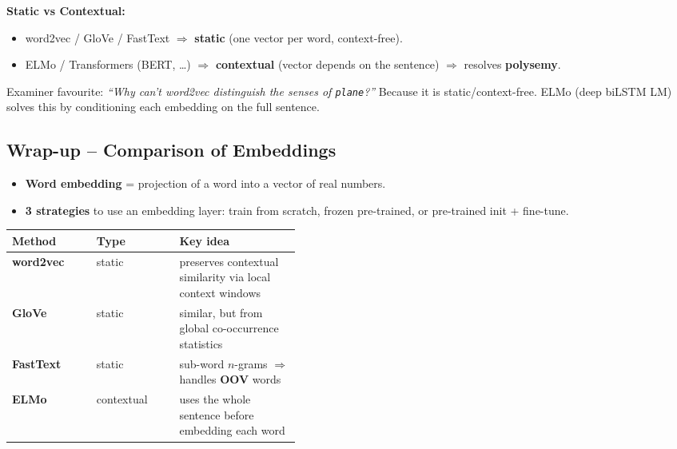 \documentclass[10pt,a4paper]{article}
\begin{document}
	\begin{importantbox}
		\textbf{Static vs Contextual:}
		\begin{itemize}[leftmargin=1.2em, nosep]
			\item word2vec / GloVe / FastText $\Rightarrow$ \textbf{static} (one vector per word, context-free).
			\item ELMo / Transformers (BERT, \dots) $\Rightarrow$ \textbf{contextual} (vector depends on the sentence) $\Rightarrow$ resolves \textbf{polysemy}.
		\end{itemize}
	\end{importantbox}

	\begin{examtipbox}
		Examiner favourite: \emph{``Why can't word2vec distinguish the senses of \textnormal{\texttt{plane}}?''} Because it is static/context-free. ELMo (deep biLSTM LM) solves this by conditioning each embedding on the full sentence.
	\end{examtipbox}

	\subsection{Wrap-up -- Comparison of Embeddings}

	\begin{itemize}[leftmargin=*]
		\item \textbf{Word embedding} = projection of a word into a vector of real numbers.
		\item \textbf{3 strategies} to use an embedding layer: train from scratch, frozen pre-trained, or pre-trained init + fine-tune.
	\end{itemize}

	\begin{center}
	\begin{tabular}{llp{0.42\linewidth}}
		\toprule
		Method & Type & Key idea \\
		\midrule
		\textbf{word2vec} & static & preserves contextual similarity via local context windows \\
		\textbf{GloVe}    & static & similar, but from global co-occurrence statistics \\
		\textbf{FastText} & static & sub-word $n$-grams $\Rightarrow$ handles \textbf{OOV} words \\
		\textbf{ELMo}     & contextual & uses the whole sentence before embedding each word \\
		\bottomrule
	\end{tabular}
	\end{center}
\end{document}
